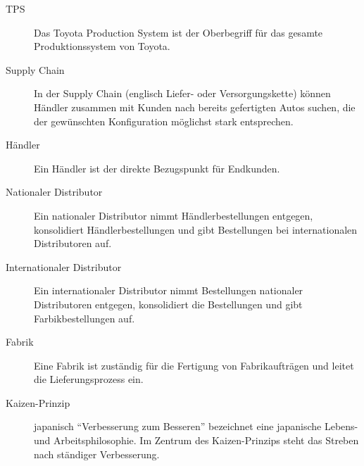 \documentclass[a4paper,10pt]{article}
\begin{document}
\begin{description}
  \item[TPS] Das Toyota Production System ist der Oberbegriff für das gesamte Produktionssystem von Toyota.
  \item[Supply Chain] In der Supply Chain (englisch Liefer- oder Versorgungskette) können Händler zusammen mit Kunden nach bereits gefertigten Autos suchen, die der gewünschten Konfiguration möglichst stark entsprechen.
  \item[Händler] Ein Händler ist der direkte Bezugspunkt für Endkunden.
  \item[Nationaler Distributor] Ein nationaler Distributor nimmt Händlerbestellungen entgegen, konsolidiert Händlerbestellungen und gibt Bestellungen bei internationalen Distributoren auf.
  \item[Internationaler Distributor] Ein internationaler Distributor nimmt Bestellungen nationaler Distributoren entgegen, konsolidiert die Bestellungen und gibt Farbikbestellungen auf.
  \item[Fabrik] Eine Fabrik ist zuständig für die Fertigung von Fabrikaufträgen und leitet die Lieferungsprozess ein.
  \item[Kaizen-Prinzip] japanisch "`Verbesserung zum Besseren"' bezeichnet eine japanische Lebens- und Arbeitsphilosophie. Im Zentrum des Kaizen-Prinzips steht das Streben nach ständiger Verbesserung.
\end{description}
\end{document}
